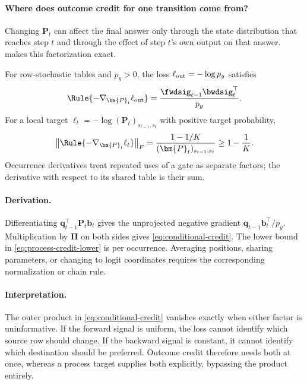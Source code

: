 \paragraph{Where does outcome credit for one transition come from?}
Changing $\bm{P}_t$ can affect the final answer only through the state
distribution that reaches step $t$ and through the effect of step $t$'s
own output on that answer.  makes this
factorization exact.

\begin{theorem}
\label{thm:forward-backward}
For row-stochastic tables and $p_y>0$, the loss
$\ell_{\rm out}=-\log p_y$ satisfies
\begin{equation}
 \Rule{-\nabla_{\bm{P}_t}\ell_{\rm out}}
 =\frac{\fwdsig_{t-1}\bwdsig_t^\top}{p_y}.
 \label{eq:conditional-credit}
\end{equation}
For a local target $\ell_t=-\log(\bm{P}_t)_{s_{t-1},s_t}$ with positive target
probability,
\begin{equation}
 \left\|\Rule{-\nabla_{\bm{P}_t}\ell_t}\right\|_F
 =\frac{1-1/K}{(\bm{P}_t)_{s_{t-1},s_t}}\ge1-\frac1K .
 \label{eq:process-credit-lower}
\end{equation}
Occurrence derivatives treat repeated uses of a gate as separate factors;
the derivative with respect to its shared table is their sum.
\end{theorem}

\paragraph{Derivation.}
Differentiating $\bm{q}_{t-1}^\top \bm{P}_t\bm{b}_t$ gives the unprojected negative gradient
$\bm{q}_{t-1}\bm{b}_t^\top/p_y$. Multiplication by $\bm{\Pi}$ on both sides gives
\cref{eq:conditional-credit}. The lower bound in \cref{eq:process-credit-lower}
is per occurrence. Averaging positions, sharing parameters, or changing to
logit coordinates requires the corresponding normalization or chain rule.

\paragraph{Interpretation.}
The outer product in \cref{eq:conditional-credit} vanishes exactly when
either factor is uninformative. If the forward signal is uniform, the
loss cannot identify which source row should change. If the backward
signal is constant, it cannot identify which destination should be
preferred. Outcome credit therefore needs both at once, whereas a process target
supplies both explicitly, bypassing the product entirely.

